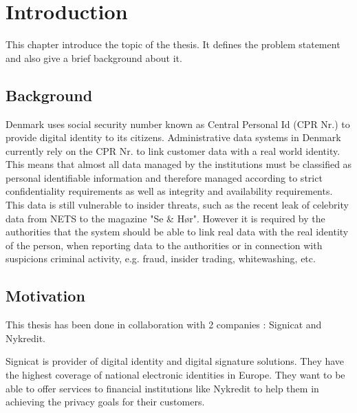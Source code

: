\chapter{Introduction}

This chapter introduce the topic of the thesis. It defines the problem statement and also give a brief background about it.
\section{Background}
Denmark uses social security number known as Central Personal Id (CPR Nr.) to provide digital identity to its citizens. Administrative data systems in Denmark currently rely on the CPR Nr. to link customer data with a real world identity. This means that almost all data managed by the institutions must be classified as personal identifiable information and therefore managed according to strict confidentiality requirements as well as integrity and availability requirements. This data is still vulnerable to insider threats, such as the recent leak of celebrity data from NETS to the magazine "Se \& Hør". However it is required by the authorities that the system should be able to link real data with the real identity of the person, when reporting data to the authorities or in connection with suspicions criminal activity, e.g. fraud, insider trading, whitewashing, etc.
\section{Motivation}
This thesis has been done in collaboration with 2 companies : Signicat and Nykredit.

Signicat is provider of digital identity and digital signature solutions. They have the highest coverage of national electronic identities in Europe. They want to be able to offer services to financial institutions like Nykredit to help them in achieving the privacy goals for their customers.

